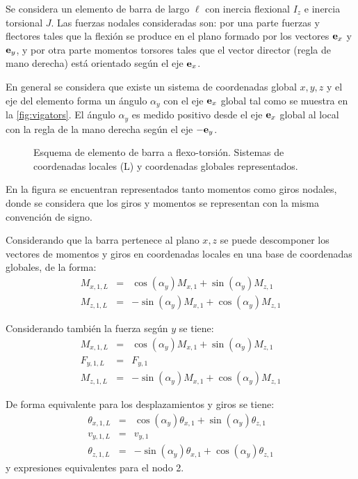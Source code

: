 Se considera un elemento de barra de largo $\ell$ con inercia flexional $I_z$ e inercia torsional $J$. %
%
Las fuerzas nodales consideradas son: por una parte fuerzas y flectores tales que la flexión se produce en el plano formado por los vectores ${\bf e}_x$ y ${\bf e}_y$, y por otra parte momentos torsores tales que el vector director (regla de mano derecha) está orientado según el eje ${\bf e}_x$. %


En general se considera que existe un sistema de coordenadas global  $x,y,z$ y el eje del elemento forma un ángulo $\alpha_y$ con el eje ${\bf e}_x$ global tal como se muestra en la \autoref{fig:vigators}. %
El ángulo $\alpha_y$ es medido positivo desde el eje ${\bf e}_x$ global al local con la regla de la mano derecha según el eje $-{\bf e}_y$.


\begin{figure}[htb]
	\centering
  \def\svgwidth{1\textwidth}
  
  \caption{Esquema de elemento de barra a flexo-torsión. Sistemas de coordenadas locales (L) y coordenadas globales representados.}
  \label{fig:vigators}
\end{figure}


En la figura se encuentran representados tanto momentos como giros nodales, donde se considera que los giros y momentos se representan con la misma convención de signo. %
%

Considerando que la barra pertenece al plano $x,z$ se puede descomponer los vectores de momentos y giros en coordenadas locales en una base de coordenadas globales, de la forma:
%
\begin{eqnarray}
M_{x,1,L} &=& \cos(\alpha_y) M_{x,1} + \sin(\alpha_y) M_{z,1} \\
M_{z,1,L} &=& - \sin(\alpha_y) M_{x,1} + \cos(\alpha_y) M_{z,1}
\end{eqnarray}

Considerando también la fuerza según $y$ se tiene:
\begin{eqnarray}
M_{x,1,L} &=& \cos(\alpha_y) M_{x,1} + \sin(\alpha_y) M_{z,1} \\
F_{y,1,L} &=& F_{y,1} \\
M_{z,1,L} &=& - \sin(\alpha_y) M_{x,1} + \cos(\alpha_y) M_{z,1}
\end{eqnarray}

De forma equivalente para los desplazamientos y giros se tiene:
\begin{eqnarray}
\theta_{x,1,L} &=& \cos(\alpha_y) \theta_{x,1} + \sin(\alpha_y) \theta_{z,1} \\
v_{y,1,L} &=& v_{y,1} \\
\theta_{z,1,L} &=& - \sin(\alpha_y) \theta_{x,1} + \cos(\alpha_y) \theta_{z,1}
\end{eqnarray}
%
y expresiones equivalentes para el nodo 2.

